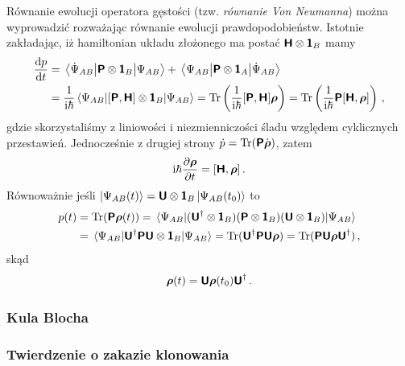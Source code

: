 \documentclass{myclass}
\begin{document}
Równanie ewolucji operatora gęstości (tzw. \textit{równanie Von Neumanna}) można wyprowadzić
rozważając równanie ewolucji prawdopodobieństw. Istotnie zakładając, iż hamiltonian układu złożonego
ma postać \(\boldsymbol{\mathsf{H}}\otimes\boldsymbol{\mathsf{1}}_B\) mamy
\begin{equation*}
    \begin{split}
        \dv{p}{t} &= \mel{\dot{\Psi}_{AB}}{\oper{P}\otimes\oper{1}_B}{\Psi_{AB}} + \mel{\Psi_{AB}}{\oper{P}\otimes\oper{1}_A}{\dot{\Psi}_{AB}} \\
        & = \frac{1}{\im\hbar} \mel{\Psi_{AB}}{[\oper{P}, \oper{H}]\otimes\oper{1}_B}{\Psi_{AB}} = \Trace\left(\frac{1}{\im\hbar}[\oper{P}, \oper{H}]\oper{\rho}\right) = \Trace\left(\frac{1}{\im\hbar}\oper{P}[\oper{H}, \oper{\rho}]\right)\,,
    \end{split}
\end{equation*}
gdzie skorzystaliśmy z liniowości i niezmienniczości śladu względem cyklicznych przestawień.
Jednocześnie z drugiej strony \(\dot{p} = \Trace(\oper{P}\dot{\oper{\rho}})\), zatem
\begin{equation*}
    \mathrm{i}\hbar\pdv{\boldsymbol{\mathsf{\rho}}}{t} = [\boldsymbol{\mathsf{H}}, \boldsymbol{\mathsf{\rho}}]\,.
\end{equation*}
Równoważnie jeśli \(\ket{\Psi_{AB}(t)} = \boldsymbol{\mathsf{U}}\otimes\boldsymbol{\mathsf{1}}_B\ket{\Psi_{AB}(t_0)}\) to
\begin{equation*}
    \begin{split}
        p(t) &= \Trace(\oper{P}\oper{\rho}(t)) = \mel{\Psi_{AB}}{(\oper{U}^\dagger\otimes\oper{1}_B)(\oper{P}\otimes\oper{1}_B)(\oper{U}\otimes\oper{1}_B)}{\Psi_{AB}} \\
        &= \mel{\Psi_{AB}}{\oper{U}^\dagger\oper{PU}\otimes\oper{1}_B}{\Psi_{AB}} =\Trace(\oper{U}^\dagger\oper{P}\oper{U}\oper{\rho})= \Trace(\oper{P}\oper{U}\oper{\rho}\oper{U}^\dagger)\,,
    \end{split}
\end{equation*}
skąd
\begin{equation*}
    \boldsymbol{\mathsf{\rho}}(t) = \boldsymbol{\mathsf{U}}\boldsymbol{\mathsf{\rho}}(t_0)\boldsymbol{\mathsf{U}}^\dagger\,.
\end{equation*}

\subsubsection{Kula Blocha}

\subsubsection{Twierdzenie o zakazie klonowania}
\end{document}
